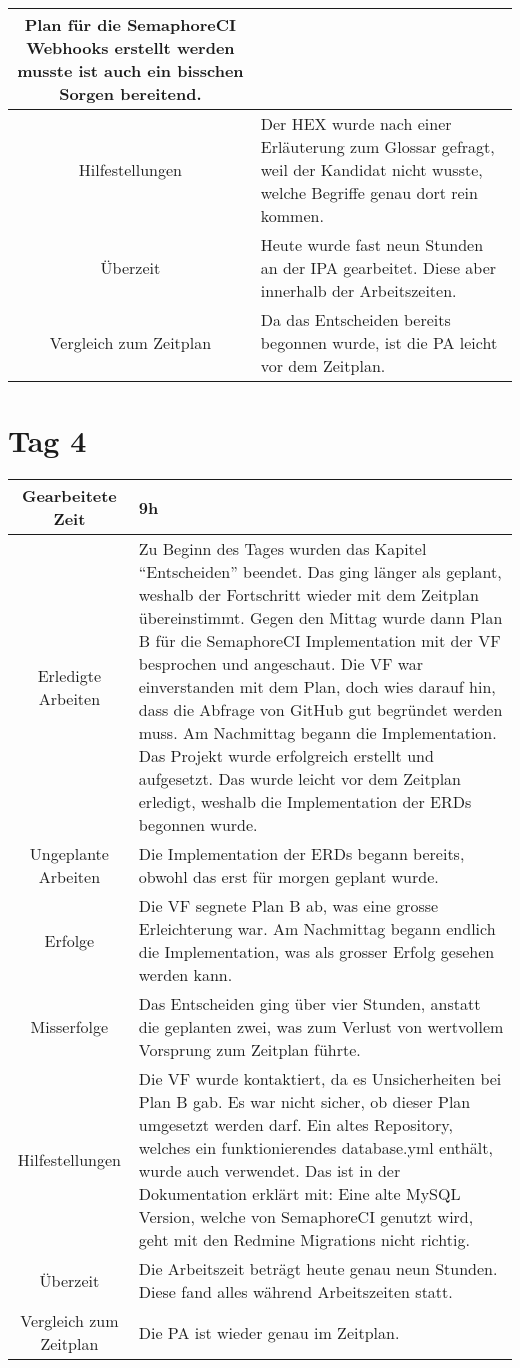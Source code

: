 \begin{tabularx}{\textwidth}[H]{|c|X|}
  Plan für die SemaphoreCI Webhooks erstellt werden musste ist auch ein bisschen Sorgen bereitend. \\ \hline
  Hilfestellungen & Der HEX wurde nach einer Erläuterung zum Glossar gefragt, weil der Kandidat nicht wusste,
  welche Begriffe genau dort rein kommen. \\ \hline
  Überzeit & Heute wurde fast neun Stunden an der IPA gearbeitet. Diese aber innerhalb der Arbeitszeiten. \\ \hline
  Vergleich zum Zeitplan & Da das Entscheiden bereits begonnen wurde, ist die PA leicht vor dem Zeitplan. \\ \hline
\end{tabularx}

\newpage

\section{Tag 4}
\begin{tabularx}{\textwidth}[H]{|c|X|}
  \hline
  Gearbeitete Zeit & 9h \\ \hline
  Erledigte Arbeiten & Zu Beginn des Tages wurden das Kapitel \enquote{Entscheiden} beendet. Das ging länger als geplant,
  weshalb der Fortschritt wieder mit dem Zeitplan übereinstimmt. \newline
  Gegen den Mittag wurde dann Plan B für die SemaphoreCI Implementation mit der VF besprochen und angeschaut. Die VF war einverstanden mit 
  dem Plan, doch wies darauf hin, dass die Abfrage von GitHub gut begründet werden muss. \newline
  Am Nachmittag begann die Implementation. Das Projekt wurde erfolgreich erstellt und aufgesetzt. Das wurde leicht vor dem
  Zeitplan erledigt, weshalb die Implementation der ERDs begonnen wurde. \\ \hline
  Ungeplante Arbeiten & Die Implementation der ERDs begann bereits, obwohl das erst für morgen geplant wurde. \\ \hline
  Erfolge & Die VF segnete Plan B ab, was eine grosse Erleichterung war. Am Nachmittag begann endlich die Implementation,
  was als grosser Erfolg gesehen werden kann. \\ \hline
  Misserfolge & Das Entscheiden ging über vier Stunden, anstatt die geplanten zwei, was zum Verlust von wertvollem
  Vorsprung zum Zeitplan führte. \\ \hline
  Hilfestellungen & Die VF wurde kontaktiert, da es Unsicherheiten bei Plan B gab. Es war nicht sicher, ob dieser Plan
  umgesetzt werden darf. Ein altes Repository, welches ein funktionierendes database.yml enthält, wurde auch verwendet.
  Das ist in der Dokumentation erklärt mit: Eine alte MySQL Version, welche von SemaphoreCI genutzt wird, geht mit den
  Redmine Migrations nicht richtig. \\ \hline
  Überzeit & Die Arbeitszeit beträgt heute genau neun Stunden. Diese fand alles während Arbeitszeiten statt. \\ \hline
  Vergleich zum Zeitplan & Die PA ist wieder genau im Zeitplan. \\ \hline
\end{tabularx}

